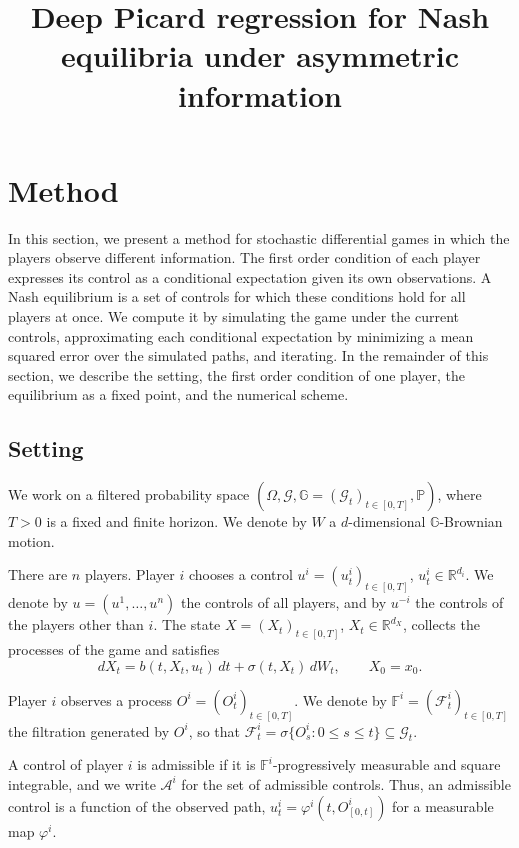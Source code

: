 \documentclass[11pt]{article}
\title{Deep Picard regression for Nash equilibria under asymmetric information}
\author{}
\date{}
\newcommand{\R}{\mathbb{R}}
\newcommand{\F}{\mathcal{F}}
\newcommand{\G}{\mathcal{G}}
\newcommand{\pr}{\mathbb{P}}
\begin{document}
\maketitle

\section{Method}
\label{sec:method}

In this section, we present a method for stochastic differential games in which the players observe different information. The first order condition of each player expresses its control as a conditional expectation given its own observations. A Nash equilibrium is a set of controls for which these conditions hold for all players at once. We compute it by simulating the game under the current controls, approximating each conditional expectation by minimizing a mean squared error over the simulated paths, and iterating. In the remainder of this section, we describe the setting, the first order condition of one player, the equilibrium as a fixed point, and the numerical scheme.

\subsection{Setting}
\label{sec:game}

We work on a filtered probability space $(\Omega, \G, \mathbb{G} = (\G_t)_{t \in [0,T]}, \pr)$, where $T > 0$ is a fixed and finite horizon. We denote by $W$ a $d$-dimensional $\mathbb{G}$-Brownian motion.

There are $n$ players. Player $i$ chooses a control $u^i = (u^i_t)_{t \in [0,T]}$, $u^i_t \in \R^{d_i}$. We denote by $u = (u^1, \dots, u^n)$ the controls of all players, and by $u^{-i}$ the controls of the players other than $i$. The state $X = (X_t)_{t \in [0,T]}$, $X_t \in \R^{d_X}$, collects the processes of the game and satisfies
\begin{equation}
  \label{eq:state}
  dX_t = b(t, X_t, u_t) \, dt + \sigma(t, X_t) \, dW_t , \qquad X_0 = x_0 .
\end{equation}

Player $i$ observes a process $O^i = (O^i_t)_{t \in [0,T]}$. We denote by $\mathbb{F}^i = (\F^i_t)_{t \in [0,T]}$ the filtration generated by $O^i$, so that $\F^i_t = \sigma\{O^i_s : 0 \le s \le t\} \subseteq \G_t$.

A control of player $i$ is admissible if it is $\mathbb{F}^i$-progressively measurable and square integrable, and we write $\mathcal{A}^i$ for the set of admissible controls. Thus, an admissible control is a function of the observed path, $u^i_t = \varphi^i(t, O^i_{[0,t]})$ for a measurable map $\varphi^i$.
\end{document}
